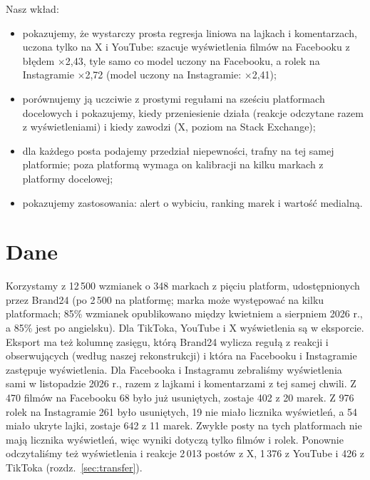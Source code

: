 \documentclass[10pt,a4paper]{article}
\newcommand{\x}[1]{$\times$#1}
\begin{document}
Nasz wkład:
\begin{itemize}
  \item pokazujemy, że wystarczy prosta regresja liniowa na lajkach i komentarzach, uczona tylko na X i YouTube:
        szacuje wyświetlenia filmów na Facebooku z błędem \x{2,43}, tyle samo co model uczony na Facebooku, a rolek na
        Instagramie \x{2,72} (model uczony na Instagramie: \x{2,41});
  \item porównujemy ją uczciwie z prostymi regułami na sześciu platformach docelowych i pokazujemy, kiedy przeniesienie
        działa (reakcje odczytane razem z wyświetleniami) i kiedy zawodzi (X, poziom na Stack Exchange);
  \item dla każdego posta podajemy przedział niepewności, trafny na tej samej platformie; poza platformą wymaga on
        kalibracji na kilku markach z platformy docelowej;
  \item pokazujemy zastosowania: alert o wybiciu, ranking marek i wartość medialną.
\end{itemize}

\section{Dane}

Korzystamy z 12\,500 wzmianek o 348 markach z pięciu platform, udostępnionych przez Brand24 (po 2\,500 na platformę;
marka może występować na kilku platformach; 85\% wzmianek opublikowano między kwietniem a sierpniem 2026 r., a 85\% jest
po angielsku). Dla TikToka, YouTube i X wyświetlenia są w eksporcie. Eksport ma też kolumnę zasięgu, którą Brand24
wylicza regułą z reakcji i obserwujących (według naszej rekonstrukcji) i która na Facebooku i Instagramie zastępuje
wyświetlenia. Dla Facebooka i Instagramu zebraliśmy wyświetlenia sami w listopadzie 2026 r., razem z lajkami
i komentarzami z tej samej chwili. Z 470 filmów na Facebooku 68 było już usuniętych, zostaje 402 z 20 marek. Z 976
rolek na Instagramie 261 było usuniętych, 19 nie miało licznika wyświetleń, a 54 miało ukryte lajki, zostaje 642
z 11 marek. Zwykłe posty na tych platformach nie mają licznika wyświetleń, więc wyniki dotyczą tylko filmów i rolek.
Ponownie odczytaliśmy też wyświetlenia i reakcje 2\,013 postów z X, 1\,376 z YouTube i 426 z TikToka
(rozdz.~\ref{sec:transfer}).
\end{document}
